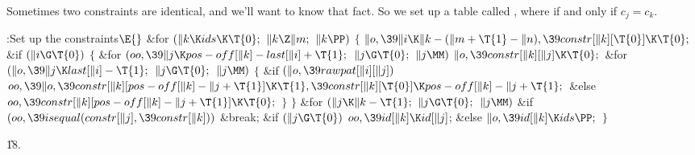 Sometimes two constraints are identical, and we'll want to know that
fact.
So we set up a table called , where 
if and only if
$c_j=c_k$.

\Y\B\4:Set up the constraints\X${}\E{}$\6
\&{for} ${}(\|k\K\\{ids}\K\T{0};{}$ ${}\|k\Z\|m;{}$ ${}\|k\PP){}$\5
${}\{{}$\1\6
${}\|o,\39\|i\K\|k-(\|m+\T{1}-\|n),\39\\{constr}[\|k][\T{0}]\K\T{0};{}$\6
\&{if} ${}(\|i\G\T{0}){}$\5
${}\{{}$\1\6
\&{for} ${}(\\{oo},\39\|j\K\\{pos}-\\{off}[\|k]-\\{last}[\|i]+\T{1};{}$ ${}\|j%
\G\T{0};{}$ ${}\|j\MM){}$\1\5
${}\|o,\39\\{constr}[\|k][\|j]\K\T{0};{}$\2\6
\&{for} ${}(\|o,\39\|j\K\\{last}[\|i]-\T{1};{}$ ${}\|j\G\T{0};{}$ ${}\|j\MM){}$%
\5
${}\{{}$\1\6
\&{if} ${}(\|o,\39\\{rawpat}[\|i][\|j]){}$\1\5
${}\\{oo},\39\|o,\39\\{constr}[\|k][\\{pos}-\\{off}[\|k]-\|j+\T{1}]\K\T{1},\39%
\\{constr}[\|k][\T{0}]\K\\{pos}-\\{off}[\|k]-\|j+\T{1};{}$\2\6
\&{else}\1\5
${}\\{oo},\39\\{constr}[\|k][\\{pos}-\\{off}[\|k]-\|j+\T{1}]\K\T{0};{}$\2\6
\4${}\}{}$\2\6
\4${}\}{}$\2\6
\&{for} ${}(\|j\K\|k-\T{1};{}$ ${}\|j\G\T{0};{}$ ${}\|j\MM){}$\1\6
\&{if} ${}(\\{oo},\39\\{isequal}(\\{constr}[\|j],\39\\{constr}[\|k])){}$\1\5
\&{break};\2\2\6
\&{if} ${}(\|j\G\T{0}){}$\1\5
${}\\{oo},\39\\{id}[\|k]\K\\{id}[\|j]{}$;\5
\2\&{else}\1\5
${}\|o,\39\\{id}[\|k]\K\\{ids}\PP;{}$\2\6
\4${}\}{}$\2\par
\U18.\fi

